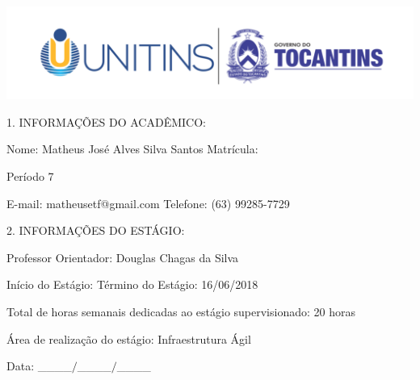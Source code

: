 
\imprimircapa

\imprimirfolhaderosto


%
% 
%
\begin{folhadeaprovacao}

  		\includegraphics[width=1\textwidth]{imagens/unitins.png}
  		
  		\ABNTEXchapterfont\large   1. INFORMAÇÕES DO ACADÊMICO:
				
  		\normalsize Nome: Matheus José Alves Silva Santos
  		\tab Matrícula:
  
  		Período 7	
  		
  		E-mail: matheusetf@gmail.com
  		\tab Telefone: (63) 99285-7729
  		
  		\par
  		\vspace*{0.5cm}     
  		  
  		\ABNTEXchapterfont\large   2. INFORMAÇÕES DO ESTÁGIO:
		  		\normalsize 
		
		Professor Orientador: Douglas Chagas da Silva
		
		Início do Estágio: \tab \tab Término do Estágio: 16/06/2018
		
		Total de horas semanais dedicadas ao estágio supervisionado: 20 horas
		
		Área de realização do estágio: Infraestrutura Ágil
		
		
		Data: \_\_\_\_$/$\_\_\_\_$/$\_\_\_\_
		\par
		\vspace*{0.5cm}


\end{folhadeaprovacao}

